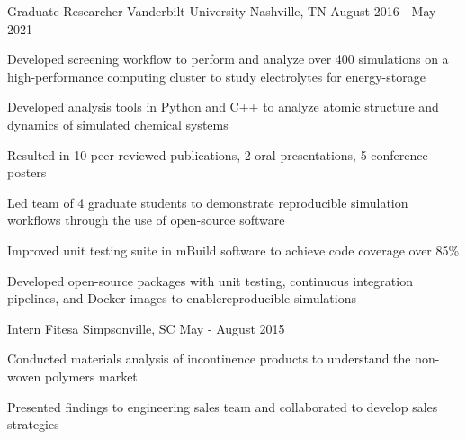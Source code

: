 
\begin{cventries}
  \cventry
    {Graduate Researcher} %
    {Vanderbilt University} %
    {Nashville, TN} %
    {August 2016 - May 2021} %
    {
        \begin{cvfirstitemstitle}
        \end{cvfirstitemstitle}
      \begin{cvsubitems} %
        \item{Developed screening workflow to perform and analyze over 400
            simulations on a high-performance \newline computing cluster to study
              electrolytes for energy-storage}
        \item{Developed analysis tools in Python and C++ to analyze atomic structure
            and dynamics of simulated chemical systems}
        \item{Resulted in 10 peer-reviewed publications, 2 oral presentations, 5
            conference posters}
      \end{cvsubitems}
      \begin{cvitemstitle}
      \end{cvitemstitle}
      \begin{cvsubitems}
        \item{Led team of 4 graduate students to demonstrate reproducible
            simulation workflows through the use of open-source software}
        \item{Improved unit testing suite in mBuild software to achieve code coverage over
            85\%}
        \item{Developed open-source packages with unit testing, continuous
            integration pipelines, and Docker images to enable\newline reproducible
            simulations}
      \end{cvsubitems}
    }


  \cventry
    {Intern} %
    {Fitesa} %
    {Simpsonville, SC} %
    {May - August 2015} %
    {
      \begin{cvitems} %
        \item{Conducted materials analysis of incontinence products to
            understand the non-woven polymers market}
        \item{Presented findings to engineering sales team and collaborated to
            develop sales strategies}
      \end{cvitems}
    }
\end{cventries}
